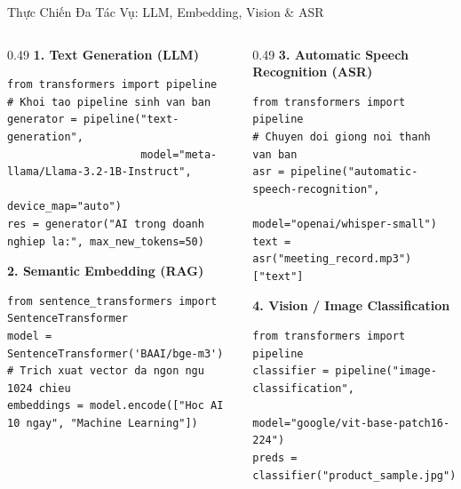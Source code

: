 \documentclass[aspectratio=169, 10pt]{beamer}
\begin{document}
\begin{frame}[fragile]{Thực Chiến Đa Tác Vụ: LLM, Embedding, Vision \& ASR}
\begin{columns}[T]
  \begin{column}{0.49\textwidth}
    \textbf{\textcolor{hfprimary}{1. Text Generation (LLM)}}
\begin{lstlisting}
from transformers import pipeline
# Khoi tao pipeline sinh van ban
generator = pipeline("text-generation", 
                     model="meta-llama/Llama-3.2-1B-Instruct",
                     device_map="auto")
res = generator("AI trong doanh nghiep la:", max_new_tokens=50)
\end{lstlisting}

    \vspace{0.5em}
    \textbf{\textcolor{hfprimary}{2. Semantic Embedding (RAG)}}
\begin{lstlisting}
from sentence_transformers import SentenceTransformer
model = SentenceTransformer('BAAI/bge-m3')
# Trich xuat vector da ngon ngu 1024 chieu
embeddings = model.encode(["Hoc AI 10 ngay", "Machine Learning"])
\end{lstlisting}
  \end{column}

  \begin{column}{0.49\textwidth}
    \textbf{\textcolor{hfprimary}{3. Automatic Speech Recognition (ASR)}}
\begin{lstlisting}
from transformers import pipeline
# Chuyen doi giong noi thanh van ban
asr = pipeline("automatic-speech-recognition", 
               model="openai/whisper-small")
text = asr("meeting_record.mp3")["text"]
\end{lstlisting}

    \vspace{0.5em}
    \textbf{\textcolor{hfprimary}{4. Vision / Image Classification}}
\begin{lstlisting}
from transformers import pipeline
classifier = pipeline("image-classification", 
                      model="google/vit-base-patch16-224")
preds = classifier("product_sample.jpg")
\end{lstlisting}
  \end{column}
\end{columns}
\end{frame}
\end{document}
